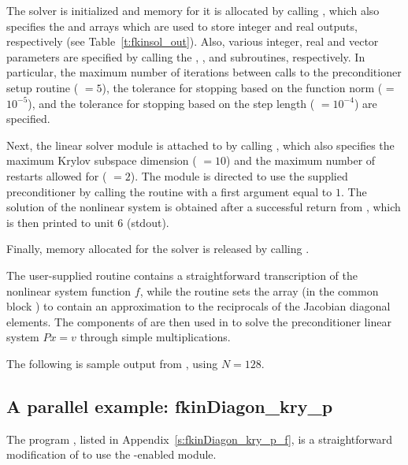 The {\kinsol} solver is initialized and memory for it is allocated by
calling , which also specifies the  and 
arrays which are used to store integer and real outputs, respectively
(see Table~\ref{t:fkinsol_out}). Also,
various integer, real and vector parameters are specified by calling the
, , and  subroutines,
respectively. In particular, the maximum number of 
iterations between calls to the preconditioner setup routine ( $=5$),
the tolerance for stopping based on the function norm ( = $10^{-5}$),
and the tolerance for stopping based on the step length ( $=10^{-4}$)
are specified.

Next, the {\kinspgmr} linear solver module is attached to {\kinsol} by calling
, which also specifies the maximum Krylov subspace dimension
( $=10$) and the maximum number of restarts allowed for {\spgmr}
( $=2$).  The {\kinspgmr} module is directed to use the supplied
preconditioner by  calling the  routine
with a first argument equal to $1$. The solution of the
nonlinear system is obtained after a successful return from , which
is then printed to unit 6 (stdout).

Finally, memory allocated for the {\kinsol} solver is released by
calling .

The user-supplied routine  contains a straightforward transcription
of the nonlinear system function $f$, while the routine  sets the
array  (in the common block ) to contain an approximation to 
the reciprocals of the Jacobian diagonal elements. The components of  are
then used in  to solve the preconditioner linear system $Px=v$
through simple multiplications.

The following is sample output from , using $N = 128$.



\subsection{A parallel example: fkinDiagon\_kry\_p}\label{ss:fkinDiagon_kry_p}

The program , listed in Appendix~\ref{s:fkinDiagon_kry_p_f}, is a
straightforward modification of  to use the {\mpi}-enabled
{\nvecp} module.


